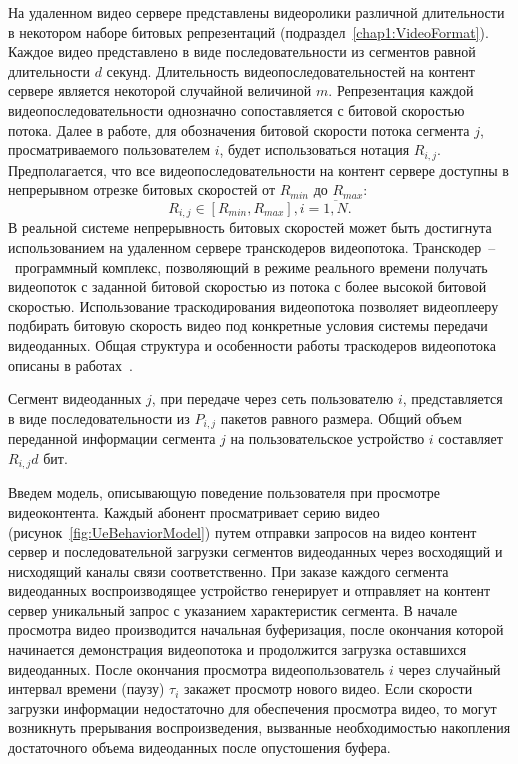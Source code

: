На удаленном видео сервере представлены видеоролики различной длительности в некотором наборе битовых репрезентаций (подраздел~\ref{chap1:VideoFormat}). Каждое видео представлено в виде последовательности из сегментов равной длительности $d$ секунд. Длительность видеопоследовательностей на контент сервере является некоторой случайной величиной $m$. Репрезентация каждой видеопоследовательности однозначно сопоставляется с битовой скоростью потока. Далее в работе, для обозначения битовой скорости потока сегмента $j$, просматриваемого пользователем $i$, будет использоваться нотация $R_{i,j}$. Предполагается, что все видеопоследовательности на контент сервере доступны в непрерывном отрезке битовых скоростей от $R_{min}$ до $R_{max}$:
\begin{equation}
R_{i,j} \in [R_{min}, R_{max}], i=\overline{1,N}.
\label{eq:BitrateConstr}
\end{equation}
В реальной системе непрерывность битовых скоростей может быть достигнута использованием на удаленном сервере транскодеров видеопотока. Транскодер~--~программный комплекс, позволяющий в режиме реального времени получать видеопоток с заданной битовой скоростью из потока с более высокой битовой скоростью. Использование траскодирования видеопотока позволяет видеоплееру подбирать битовую скорость видео под конкретные условия системы передачи видеоданных. Общая структура и особенности работы траскодеров видеопотока описаны в работах~\cite{1184336,1369700}.

Сегмент видеоданных $j$, при передаче через сеть пользователю $i$, представляется в виде последовательности из $P_{i,j}$ пакетов равного размера. Общий объем переданной информации сегмента $j$ на пользовательское устройство $i$ составляет $R_{i,j} d$ бит.

Введем модель, описывающую поведение пользователя при просмотре видеоконтента. Каждый абонент просматривает серию видео (рисунок~\ref{fig:UeBehaviorModel}) путем отправки запросов на видео контент сервер и последовательной загрузки сегментов видеоданных через восходящий и нисходящий каналы связи соответственно. При заказе каждого сегмента видеоданных воспроизводящее устройство генерирует и отправляет на контент сервер уникальный запрос с указанием характеристик сегмента. В начале просмотра видео производится начальная буферизация, после окончания которой начинается демонстрация видеопотока и продолжится загрузка оставшихся видеоданных. После окончания просмотра видеопользователь $i$ через случайный интервал времени (паузу) $\tau_i$ закажет просмотр нового видео. Если скорости загрузки информации недостаточно для обеспечения просмотра видео, то могут возникнуть прерывания воспроизведения, вызванные необходимостью накопления достаточного объема видеоданных после опустошения буфера.


